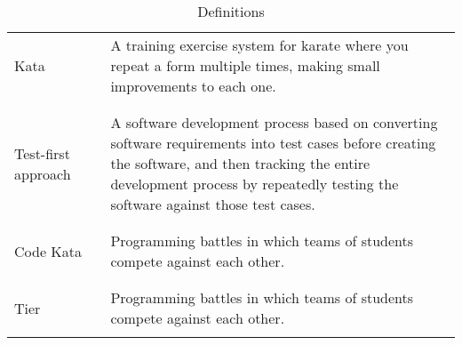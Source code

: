 \begin{table}[H]
\begin{tabular}{l l p{10cm}}
        Kata                & \vline & A training exercise system for karate where you repeat a form multiple times, making small improvements to each one.   \\
                            &        &                                                                                                                        \\\hline \\
        Test-first approach & \vline & A software development process based on converting software requirements into test cases before creating the software,
                                       and then tracking the entire development process by repeatedly testing the software against those test cases.          \\
                            &        &                                                                                                                        \\\hline \\
        Code Kata           & \vline & Programming battles in which teams of students compete against each other.                                             \\
                            &        &                                                                                                                        \\\hline \\
        Tier                & \vline & Programming battles in which teams of students compete against each other.                                             \\
                            &        &                                                                                                                        \\
        
        
        \hline
    \end{tabular}
    \caption{Definitions}
\end{table}


